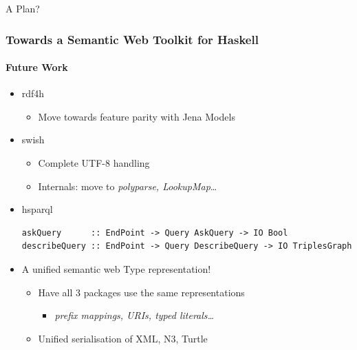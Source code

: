 \documentclass{beamer}
\begin{document}
\begin{frame}

\huge
\begin{center}
A Plan?
\end{center}

\end{frame}

\begin{frame}[fragile]
\frametitle{Towards a Semantic Web Toolkit for Haskell}
\framesubtitle{Future Work}

\begin{itemize}
\item rdf4h
  
  \begin{itemize}
  \item Move towards feature parity with Jena Models
  \end{itemize}
  
\item swish
  
  \begin{itemize}
  \item Complete UTF-8 handling
  \item Internals: move to \emph{polyparse, LookupMap}\ldots
  \end{itemize}
  
\item hsparql
\scriptsize
\begin{verbatim}
askQuery      :: EndPoint -> Query AskQuery -> IO Bool
describeQuery :: EndPoint -> Query DescribeQuery -> IO TriplesGraph
\end{verbatim}
\normalsize

  \bigskip
\item A unified semantic web Type representation!
  
  \begin{itemize}
  \item Have all 3 packages use the same representations
\begin{itemize}
\item \emph{prefix mappings, URIs, typed literals\ldots}
\end{itemize}
  
\item Unified serialisation of XML, N3, Turtle

    
  \end{itemize}
  
\end{itemize}

\end{frame}
\end{document}
